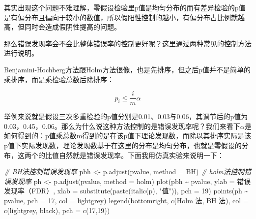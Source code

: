 \documentclass[]{tufte-book}
\newenvironment{Shaded}{}{}
\newcommand{\AttributeTok}[1]{\textcolor[rgb]{0.49,0.56,0.16}{#1}}
\newcommand{\CommentTok}[1]{\textcolor[rgb]{0.38,0.63,0.69}{\textit{#1}}}
\newcommand{\DecValTok}[1]{\textcolor[rgb]{0.25,0.63,0.44}{#1}}
\newcommand{\FunctionTok}[1]{\textcolor[rgb]{0.02,0.16,0.49}{#1}}
\newcommand{\NormalTok}[1]{#1}
\newcommand{\OtherTok}[1]{\textcolor[rgb]{0.00,0.44,0.13}{#1}}
\newcommand{\SpecialCharTok}[1]{\textcolor[rgb]{0.25,0.44,0.63}{#1}}
\newcommand{\StringTok}[1]{\textcolor[rgb]{0.25,0.44,0.63}{#1}}
\begin{document}
其实出现这个问题不难理解，零假设检验里p值是均匀分布的而有差异检验的p值是有偏分布且偏向于较小的数值，所以假阳性控制的越小，有偏分布占比例就越高，但同时会造成假阴性提高的问题。

那么错误发现率会不会比整体错误率的控制更好呢？这里通过两种常见的控制方法进行说明。

Benjamini-Hochberg方法跟Holm方法很像，也是先排序，但之后p值并不是简单的乘排序，而是乘检验总数后除排序：

\[
p_i \leq \frac{i}{m} \alpha
\]

举例来说就是假设三次多重检验的p值分别是0.01、0.03与0.06，其调节后的p值为0.03，0.45，0.06。那么为什么说这种方法控制的是错误发现率呢？我们来看下\(\alpha\)是如何得到的：p值乘总数m得到的是在该p值下理论发现数，而除以其排序实际是该p值下实际发现数，理论发现数基于在这里的分布是均匀分布，也就是零假设的分布，这两个的比值自然就是错误发现率。下面我用仿真实验来说明一下：

\begin{Shaded}
\begin{Highlighting}[]
\CommentTok{\# BH法控制错误发现率}
\NormalTok{pbh }\OtherTok{\textless{}{-}} \FunctionTok{p.adjust}\NormalTok{(pvalue, }\AttributeTok{method =} \StringTok{\textquotesingle{}BH\textquotesingle{}}\NormalTok{)}
\CommentTok{\# holm法控制错误发现率}
\NormalTok{ph }\OtherTok{\textless{}{-}} \FunctionTok{p.adjust}\NormalTok{(pvalue, }\AttributeTok{method =} \StringTok{\textquotesingle{}holm\textquotesingle{}}\NormalTok{)}
\FunctionTok{plot}\NormalTok{(pbh }\SpecialCharTok{\textasciitilde{}}\NormalTok{ pvalue,}
     \AttributeTok{ylab =} \StringTok{\textquotesingle{}错误发现率（FDR）\textquotesingle{}}\NormalTok{,}
     \AttributeTok{xlab =} \FunctionTok{substitute}\NormalTok{(}\FunctionTok{paste}\NormalTok{(}\FunctionTok{italic}\NormalTok{(}\StringTok{\textquotesingle{}p\textquotesingle{}}\NormalTok{), }\StringTok{"值"}\NormalTok{)),}
     \AttributeTok{pch =} \DecValTok{19}\NormalTok{)}
\FunctionTok{points}\NormalTok{(ph }\SpecialCharTok{\textasciitilde{}}\NormalTok{ pvalue, }\AttributeTok{pch =} \DecValTok{17}\NormalTok{, }\AttributeTok{col =} \StringTok{\textquotesingle{}lightgrey\textquotesingle{}}\NormalTok{)}
\FunctionTok{legend}\NormalTok{(}\StringTok{\textquotesingle{}bottomright\textquotesingle{}}\NormalTok{,}
       \FunctionTok{c}\NormalTok{(}\StringTok{\textquotesingle{}Holm 法\textquotesingle{}}\NormalTok{, }\StringTok{\textquotesingle{}BH 法\textquotesingle{}}\NormalTok{),}
       \AttributeTok{col =} \FunctionTok{c}\NormalTok{(}\StringTok{\textquotesingle{}lightgrey\textquotesingle{}}\NormalTok{, }\StringTok{\textquotesingle{}black\textquotesingle{}}\NormalTok{),}
       \AttributeTok{pch =} \FunctionTok{c}\NormalTok{(}\DecValTok{17}\NormalTok{,}\DecValTok{19}\NormalTok{))}
\end{Highlighting}
\end{Shaded}
\end{document}
